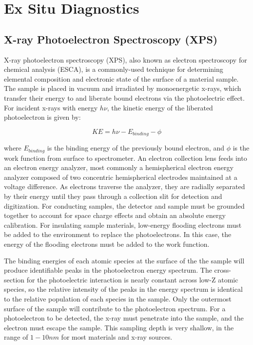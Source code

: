 \documentclass{jpp}
\begin{document}
\section{Ex Situ Diagnostics}

\subsection{X-ray Photoelectron Spectroscopy (XPS)}

X-ray photoelectron spectroscopy (XPS), also known as electron spectroscopy for chemical analysis (ESCA), is a commonly-used technique for determining elemental composition and electronic state of the surface of a material sample. The sample is placed in vacuum and irradiated by monoenergetic x-rays, which transfer their energy to and liberate bound electrons via the photoelectric effect. For incident x-rays with energy $h \nu$, the kinetic energy of the liberated photoelectron is given by:

\begin{equation*}
KE = h \nu - E_{binding} - \phi
\end{equation*}

where $E_{binding}$ is the binding energy of the previously bound electron, and $\phi$ is the work function from surface to spectrometer. An electron collection lens feeds into an electron energy analyzer, most commonly a hemispherical electron energy analyzer composed of two concentric hemispherical electrodes maintained at a voltage difference. As electrons traverse the analyzer, they are radially separated by their energy until they pass through a collection slit for detection and digitization. For conducting samples, the detector and sample must be grounded together to account for space charge effects and obtain an absolute energy calibration. For insulating sample materials, low-energy flooding electrons must be added to the environment to replace the photoelectrons. In this case, the energy of the flooding electrons must be added to the work function.

The binding energies of each atomic species at the surface of the the sample will produce identifiable peaks in the photoelectron energy spectrum. The cross-section for the photoelectric interaction is nearly constant across low-Z atomic species, so the relative intensity of the peaks in the energy spectrum is identical to the relative population of each species in the sample. Only the outermost surface of the sample will contribute to the photoelectron spectrum. For a photoelectron to be detected, the x-ray must penetrate into the sample, and the electron must escape the sample. This sampling depth is very shallow, in the range of $1-10nm$ for most materials and x-ray sources.
\end{document}
